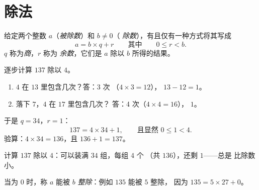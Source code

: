 \section{除法}

\begin{theorem}[带余除法]\label{thm:g6:wholes:division}
给定两个整数 $a$（\emph{被除数}）和 $b \neq 0$（
\emph{除数}），有且仅有一种方式将其写成
\[
a = b \times q + r
\qquad\text{其中}\qquad
0 \leq r < b .
\]
$q$ 称为\emph{商}，$r$ 称为
\emph{余数}，它们是 $a$ 除以 $b$ 所得的结果。
\end{theorem}
\admitted

\begin{example}\label{ex:g6:wholes:division}
逐步计算 $137$ 除以 $4$。
\begin{enumerate}
  \item $4$ 在 $13$ 里包含几次？答：3 次
        （$4 \times 3 = 12$）， $13 - 12 = 1$。
  \item 落下 $7$，$4$ 在 $17$ 里包含几次？
        答：4 次（$4 \times 4 = 16$）， $1$。
\end{enumerate}
于是 $q = 34$，$r = 1$：
\[
137 = 4 \times 34 + 1, \qquad\text{且显然 } 0 \leq 1 < 4 .
\]
验算：$4 \times 34 = 136$，且 $136 + 1 = 137$。
\end{example}

\begin{omfigure}

{\small 计算 $137$ 除以 $4$：可以装满 $34$ 组，每组 $4$ 个
（共 $136$），还剩 $1$——总是
比除数小。}
\end{omfigure}

\begin{definition}[能被……整除]\label{def:g6:wholes:divisible}
当为 $0$ 时，称 $a$ 能被 $b$
\emph{整除}：例如 $135$ 能被 $5$ 整除，
因为 $135 = 5 \times 27 + 0$。
\end{definition}

